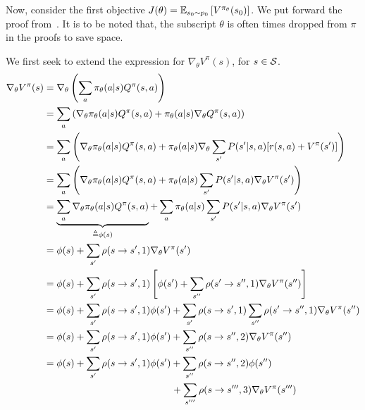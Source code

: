 \documentclass{article}
\begin{document}
Now, consider the first objective $J(\theta) =\BBE_{s_0\sim p_0}\left[V^{\pi_\theta}(s_0)\right]$. We put forward the proof from~\cite{sutton2018reinforcement}. It is to be noted that, the subscript $\theta$ is often times dropped from $\pi$ in the proofs to save space.
\begin{tcolorbox}[breakable,enhanced,colback=gray!10!white,colframe=gray!50!black,
title={Policy Gradient Derivation for $J(\theta) = \BBE_{s_0\sim p_0}\left[V^{\pi_\theta}(s_0)\right]$}]

We first seek to extend the expression for $\nabla_\theta V^\pi(s)$, for $s\in {\mathcal S}$.
\begin{align*}
    \nabla_\theta V^{\pi}(s) &= \nabla_\theta\left(\sum_a \pi_\theta(a|s)Q^\pi(s,a)\right)\\
    &=\sum_a\left(\nabla_\theta \pi_\theta(a|s)Q^\pi(s,a) + \pi_\theta(a|s)\nabla_\theta Q^\pi(s,a)\right) \\
    &= \sum_a\left(\nabla_\theta \pi_\theta(a|s)Q^\pi(s,a) + \pi_\theta(a|s)\nabla_\theta \sum_{s^\prime}P(s^\prime|s,a)[r(s,a) + V^\pi(s^\prime)]\right)\\
    &=\sum_a\left(\nabla_\theta \pi_\theta(a|s)Q^\pi(s,a) + \pi_\theta(a|s) \sum_{s^\prime}P(s^\prime|s,a) \nabla_\theta V^\pi(s^\prime)\right)\\
    &=\underbrace{\sum_a\nabla_\theta \pi_\theta(a|s)Q^\pi(s,a)}_{\triangleq \phi(s)} + \sum_a\pi_\theta(a|s) \sum_{s^\prime}P(s^\prime|s,a) \nabla_\theta V^\pi(s^\prime)\\
    &=\phi(s) + \sum_{s^\prime}\rho(s\to s^\prime,1) \nabla_\theta V^\pi(s^\prime)\\
    &=\phi(s) + \sum_{s^\prime}\rho(s\to s^\prime,1) \left[ \phi(s^\prime) +\sum_{s^{\dprime}}\rho(s^\prime\to s^{\dprime},1)\nabla_\theta V^\pi(s^{\dprime})\right]\\
    &=\phi(s) + \sum_{s^\prime}\rho(s\to s^\prime,1) \phi(s^\prime) +\sum_{s^\prime}\rho(s\to s^\prime,1)\sum_{s^{\dprime}}\rho(s^\prime\to s^{\dprime},1)\nabla_\theta V^\pi(s^{\dprime})\\
    &=\phi(s) + \sum_{s^\prime}\rho(s\to s^\prime,1) \phi(s^\prime) +\sum_{s^{\dprime}}\rho(s\to s^{\dprime},2)\nabla_\theta V^\pi(s^{\dprime})\\
    &=\phi(s) + \sum_{s^\prime}\rho(s\to s^\prime,1) \phi(s^\prime) +\sum_{s^{\dprime}}\rho(s\to s^{\dprime},2)\phi(s^{\dprime})\\    
    &\phantom{=\phi(s) + \sum_{s^\prime}\rho(s\to s^\prime,1) \phi(s^\prime)~}+\sum_{s^{\tprime}}\rho(s\to s^{\tprime},3)\nabla_\theta V^\pi(s^{\tprime})\\

\end{align*}
\end{tcolorbox}
\end{document}
